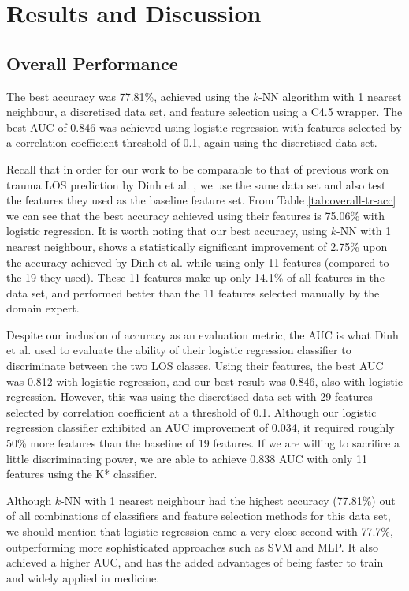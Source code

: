 \documentclass{article}
\begin{document}
\section{Results and Discussion}
\label{sec:results}

\subsection{Overall Performance}
The best accuracy was 77.81\%, achieved using the $k$-NN algorithm
with 1 nearest neighbour, a discretised data set, and feature selection using a
C4.5 wrapper. The best AUC of 0.846 was achieved using logistic regression with
features selected by a correlation coefficient threshold of 0.1, again
using the discretised data set.

Recall that in order for our work to be comparable to that of previous work on
trauma LOS prediction by Dinh et al. \cite{Dinh2013a}, we use the same data
set and also test the features they used as the baseline feature set.
From Table \ref{tab:overall-tr-acc} we can see that
the best accuracy achieved using their features is 75.06\% with logistic
regression.
It is worth noting that our best accuracy, using $k$-NN with 1
nearest neighbour, shows a statistically significant improvement of 2.75\% upon
the accuracy achieved by Dinh et al.
while using only 11 features (compared to the 19 they used). These 11 features
make up only 14.1\% of all features in the data set, and performed better than
the 11 features selected manually by the domain expert.

Despite our inclusion of accuracy as an evaluation metric, the AUC is what Dinh
et al. \cite{Dinh2013a}
used to evaluate the ability of their logistic regression classifier to
discriminate between the two LOS classes. Using their features, the best AUC
was 0.812 with logistic regression, and our best result was 0.846, also with
logistic regression. However, this was using the discretised data set with 29
features selected by correlation coefficient at a threshold of 0.1.
Although our logistic regression classifier exhibited an AUC improvement of
0.034, it required roughly 50\% more features than the baseline of 19 features.
If we are willing to sacrifice a little discriminating power, we are able to
achieve 0.838 AUC with only 11 features using the K* classifier.

Although $k$-NN with 1 nearest neighbour had the highest accuracy (77.81\%) out
of all combinations of classifiers and feature selection methods for this data
set, we should mention that logistic regression came a very close second with
77.7\%, outperforming more sophisticated approaches such as SVM and MLP. It
also achieved a higher AUC, and has the added advantages of being faster to
train and widely applied in medicine.
\end{document}
